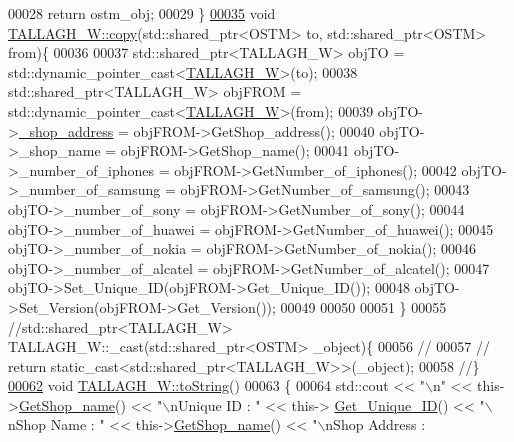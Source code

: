 \begin{DoxyCode}
00028     \textcolor{keywordflow}{return} ostm\_obj;
00029 \}
\hypertarget{_t_a_l_l_a_g_h___w_8cpp_source.tex_l00035}{}\hyperlink{class_t_a_l_l_a_g_h___w_a7cd62cf694fbe8c6242916f26df8f6ca_a7cd62cf694fbe8c6242916f26df8f6ca}{00035} \textcolor{keywordtype}{void} \hyperlink{class_t_a_l_l_a_g_h___w_a7cd62cf694fbe8c6242916f26df8f6ca_a7cd62cf694fbe8c6242916f26df8f6ca}{TALLAGH\_W::copy}(std::shared\_ptr<OSTM> to, std::shared\_ptr<OSTM> from)\{
00036 
00037     std::shared\_ptr<TALLAGH\_W> objTO = std::dynamic\_pointer\_cast<\hyperlink{class_t_a_l_l_a_g_h___w}{TALLAGH\_W}>(to);
00038     std::shared\_ptr<TALLAGH\_W> objFROM = std::dynamic\_pointer\_cast<\hyperlink{class_t_a_l_l_a_g_h___w}{TALLAGH\_W}>(from);
00039     objTO->\hyperlink{class_t_a_l_l_a_g_h___w_a268003f2cd359fa50c6061f1ad011c67_a268003f2cd359fa50c6061f1ad011c67}{\_shop\_address} = objFROM->GetShop\_address();
00040     objTO->\_shop\_name = objFROM->GetShop\_name();
00041     objTO->\_number\_of\_iphones = objFROM->GetNumber\_of\_iphones();
00042     objTO->\_number\_of\_samsung = objFROM->GetNumber\_of\_samsung();
00043     objTO->\_number\_of\_sony = objFROM->GetNumber\_of\_sony();
00044     objTO->\_number\_of\_huawei = objFROM->GetNumber\_of\_huawei();
00045     objTO->\_number\_of\_nokia = objFROM->GetNumber\_of\_nokia();
00046     objTO->\_number\_of\_alcatel = objFROM->GetNumber\_of\_alcatel();
00047     objTO->Set\_Unique\_ID(objFROM->Get\_Unique\_ID());
00048     objTO->Set\_Version(objFROM->Get\_Version());
00049     
00050    
00051 \}
00055 \textcolor{comment}{//std::shared\_ptr<TALLAGH\_W> TALLAGH\_W::\_cast(std::shared\_ptr<OSTM> \_object)\{}
00056 \textcolor{comment}{//    }
00057 \textcolor{comment}{//    return static\_cast<std::shared\_ptr<TALLAGH\_W>>(\_object);}
00058 \textcolor{comment}{//\}}
\hypertarget{_t_a_l_l_a_g_h___w_8cpp_source.tex_l00062}{}\hyperlink{class_t_a_l_l_a_g_h___w_ac7a438b7511cf2931490e6b44eff4a49_ac7a438b7511cf2931490e6b44eff4a49}{00062} \textcolor{comment}{}\textcolor{keywordtype}{void} \hyperlink{class_t_a_l_l_a_g_h___w_ac7a438b7511cf2931490e6b44eff4a49_ac7a438b7511cf2931490e6b44eff4a49}{TALLAGH\_W::toString}()
00063 \{
00064     std::cout << \textcolor{stringliteral}{"\(\backslash\)n"} << this->\hyperlink{class_t_a_l_l_a_g_h___w_a3baca7e101bfde39d7a1bf91d99c4f51_a3baca7e101bfde39d7a1bf91d99c4f51}{GetShop\_name}() << \textcolor{stringliteral}{"\(\backslash\)nUnique ID : "} << this->
      \hyperlink{class_o_s_t_m_a5a01a8b98d16b1d1904ecf9356e7b71d_a5a01a8b98d16b1d1904ecf9356e7b71d}{Get\_Unique\_ID}() << \textcolor{stringliteral}{"\(\backslash\)nShop Name : "}  << this->\hyperlink{class_t_a_l_l_a_g_h___w_a3baca7e101bfde39d7a1bf91d99c4f51_a3baca7e101bfde39d7a1bf91d99c4f51}{GetShop\_name}() << \textcolor{stringliteral}{"\(\backslash\)nShop Address : 
}
\end{DoxyCode}
